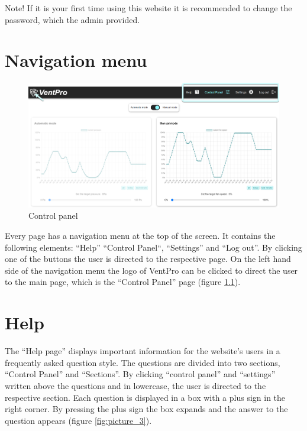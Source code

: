 \color{red}
Note! If it is your first time using this website it is recommended to change the password, which the admin provided.
\color{black}



\chapter{Navigation menu}
\label{sec:navigation_menu}

\begin{figure}[h]
\centering
\includegraphics[width=1.0\textwidth]{img/Picture2}
\caption{Control panel}
\label{fig:picture_2}
\end{figure}
\vspace{0.3cm}

Every page has a navigation menu at the top of the screen. It contains the following elements: “Help” “Control Panel“, “Settings” and “Log out”. By clicking one of the buttons the user is directed to the respective page. On the left hand side of the navigation menu the logo of VentPro can be clicked to direct the user to the main page, which is the “Control Panel” page (figure \ref{fig:picture_2}).
 
 
 
\chapter{Help}
\label{sec:help}

The “Help page” displays important information for the website’s users in a frequently asked question style. The questions are divided into two sections, “Control Panel” and “Sections”. By clicking “control panel” and “settings” written above the questions and in lowercase, the user is directed to the respective section. Each question is displayed in a box with a plus sign in the right corner. By pressing the plus sign the box expands and the answer to the question appears (figure \ref{fig:picture_3}).

